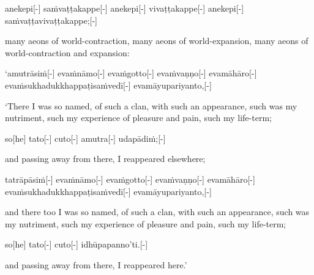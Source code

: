 \begin{samepage}
\begingl[glneveryline={\PaliGlossA,\PaliGlossB}]
anekepi[-] saṁvaṭṭakappe[-] anekepi[-] vivaṭṭakappe[-] anekepi[-] saṁvaṭṭavivaṭṭakappe;[-]
\endgl
\nopagebreak
\linespread{0.5}
\begin{spacin}{0.2}
{\PaliGlossFT many aeons of world-contraction, many aeons of world-expansion, many aeons of world-contraction and expansion:}
\end{spacin}
\vskip 12pt
\end{samepage}
\begin{samepage}
\begingl[glneveryline={\PaliGlossA,\PaliGlossB}]
‘amutrāsiṁ[-] evaṁnāmo[-] evaṁgotto[-] evaṁvaṇṇo[-] evamāhāro[-] evaṁsukhadukkhappaṭisaṁvedī[-] evamāyupariyanto,[-]
\endgl
\nopagebreak
\linespread{0.5}
\begin{spacin}{0.2}
{\PaliGlossFT ‘There I was so named, of such a clan, with such an appearance, such was my nutriment, such my experience of pleasure and pain, such my life-term;}
\end{spacin}
\vskip 12pt
\end{samepage}
\begin{samepage}
\begingl[glneveryline={\PaliGlossA,\PaliGlossB}]
so[he] tato[-] cuto[-] amutra[-] udapādiṁ;[-]
\endgl
\nopagebreak
\linespread{0.5}
\begin{spacin}{0.2}
{\PaliGlossFT and passing away from there, I reappeared elsewhere;}
\end{spacin}
\vskip 12pt
\end{samepage}
\begin{samepage}
\begingl[glneveryline={\PaliGlossA,\PaliGlossB}]
tatrāpāsiṁ[-] evaṁnāmo[-] evaṁgotto[-] evaṁvaṇṇo[-] evamāhāro[-] evaṁsukhadukkhappaṭisaṁvedī[-] evamāyupariyanto,[-]
\endgl
\nopagebreak
\linespread{0.5}
\begin{spacin}{0.2}
{\PaliGlossFT and there too I was so named, of such a clan, with such an appearance, such was my nutriment, such my experience of pleasure and pain, such my life-term;}
\end{spacin}
\vskip 12pt
\end{samepage}
\begin{samepage}
\begingl[glneveryline={\PaliGlossA,\PaliGlossB}]
so[he] tato[-] cuto[-] idhūpapanno’ti.[-]
\endgl
\nopagebreak
\linespread{0.5}
\begin{spacin}{0.2}
{\PaliGlossFT and passing away from there, I reappeared here.’}
\end{spacin}
\vskip 12pt
\end{samepage}
